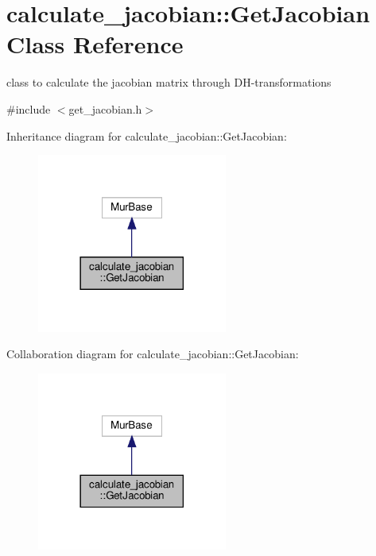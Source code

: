\hypertarget{classcalculate__jacobian_1_1GetJacobian}{}\section{calculate\+\_\+jacobian\+:\+:Get\+Jacobian Class Reference}
\label{classcalculate__jacobian_1_1GetJacobian}


class to calculate the jacobian matrix through D\+H-\/transformations  




{\ttfamily \#include $<$get\+\_\+jacobian.\+h$>$}



Inheritance diagram for calculate\+\_\+jacobian\+:\+:Get\+Jacobian\+:
\nopagebreak
\begin{figure}[H]
\begin{center}
\leavevmode
\includegraphics[width=177pt]{df/d1f/classcalculate__jacobian_1_1GetJacobian__inherit__graph}
\end{center}
\end{figure}


Collaboration diagram for calculate\+\_\+jacobian\+:\+:Get\+Jacobian\+:
\nopagebreak
\begin{figure}[H]
\begin{center}
\leavevmode
\includegraphics[width=177pt]{dc/d69/classcalculate__jacobian_1_1GetJacobian__coll__graph}
\end{center}
\end{figure}

